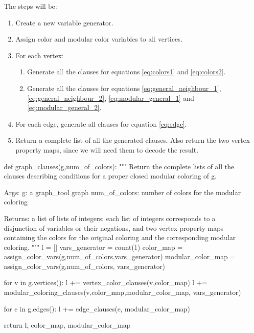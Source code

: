 \documentclass[letterpaper]{article}
\begin{document}
The steps will be:
\begin{enumerate}
   \item Create a new variable generator.
   \item Assign color and modular color variables to all vertices.
   \item For each vertex:
      \begin{enumerate}
         \item Generate all the clauses for equations \eqref{eq:colors1} and
            \eqref{eq:colors2}.
         \item Generate all the clauses for equations
            \eqref{eq:general_neighbour_1}, 
            \eqref{eq:general_neighbour_2}, 
            \eqref{eq:modular_general_1} and 
            \eqref{eq:modular_general_2}.
      \end{enumerate}
   \item For each edge, generate all clauses for equation \eqref{eq:edge}.
   \item Return a complete list of all the generated clauses.  Also return the
      two vertex property maps, since we will need them to decode the result.
\end{enumerate}

\begin{pyblock}
def graph_clauses(g,num_of_colors):
   """
   Return the complete lists of all the clauses describing 
   conditions for a proper closed modular coloring of g.

   Args:
      g: a graph_tool graph
      num_of_colors: number of colors for the modular coloring

   Returns: 
      a list of lists of integers: each list of integers
      corresponds to a disjunction of variables or their
      negations, and two vertex property maps containing 
      the colors for the original coloring and the corresponding 
      modular coloring.
   """
   l = []
   vars_generator = count(1)
   color_map = assign_color_vars(g,num_of_colors,vars_generator)
   modular_color_map = assign_color_vars(g,num_of_colors,
                                         vars_generator)

   for v in g.vertices():
      l += vertex_color_clauses(v,color_map)
      l += modular_coloring_clauses(v,color_map,modular_color_map,
                                    vars_generator)

   for e in g.edges():
      l +=  edge_clauses(e, modular_color_map)

   return l, color_map, modular_color_map
\end{pyblock}
\end{document}
